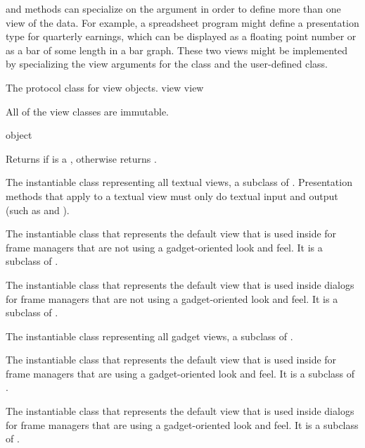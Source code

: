  and  methods can specialize on the  argument
in order to define more than one view of the data.  For example, a spreadsheet
program might define a presentation type for quarterly earnings, which can be
displayed as a floating point number or as a bar of some length in a bar graph.
These two views might be implemented by specializing the view arguments for the
 class and the user-defined  class.


The protocol class for view objects.
 {view} {view}

All of the view classes are immutable.

 {object}

Returns  if  is a , otherwise returns
.


The instantiable class representing all textual views, a subclass of .
Presentation methods that apply to a textual view must only do textual input and
output (such as  and ).


The instantiable class that represents the default view that is used inside
 for frame managers that are not using a gadget-oriented look
and feel.  It is a subclass of .


The instantiable class that represents the default view that is used inside
 dialogs for frame managers that are not using a
gadget-oriented look and feel.  It is a subclass of .


The instantiable class representing all gadget views, a subclass of .


The instantiable class that represents the default view that is used inside
 for frame managers that are using a gadget-oriented look and
feel.  It is a subclass of .


The instantiable class that represents the default view that is used inside
 dialogs for frame managers that are using a
gadget-oriented look and feel.  It is a subclass of .

